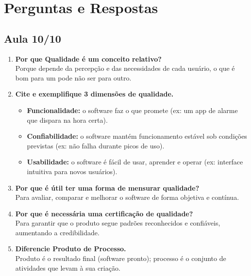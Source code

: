 \documentclass[12pt]{article}
\begin{document}
\section*{Perguntas e Respostas}

\subsection*{Aula 10/10}

\begin{enumerate}[label=\textbf{\arabic*.}]
  \item \textbf{Por que Qualidade é um conceito relativo?} \\
   Porque depende da percepção e das necessidades de cada usuário, o que é bom para um pode não ser para outro.

  \item \textbf{Cite e exemplifique 3 dimensões de qualidade.} \\
    \begin{itemize}
      \item \textbf{Funcionalidade:} o software faz o que promete (ex: um app de alarme que dispara na hora certa). 
      \item \textbf{Confiabilidade:} o software mantém funcionamento estável sob condições previstas (ex: não falha durante picos de uso). 
      \item \textbf{Usabilidade:} o software é fácil de usar, aprender e operar (ex: interface intuitiva para novos usuários).
    \end{itemize}

  \item \textbf{Por que é útil ter uma forma de mensurar qualidade?} \\
    Para avaliar, comparar e melhorar o software de forma objetiva e contínua.

  \item \textbf{Por que é necessária uma certificação de qualidade?} \\
    Para garantir que o produto segue padrões reconhecidos e confiáveis, aumentando a credibilidade.

  \item \textbf{Diferencie Produto de Processo.} \\
  Produto é o resultado final (software pronto); processo é o conjunto de atividades que levam à sua criação.


\end{enumerate}
\end{document}

